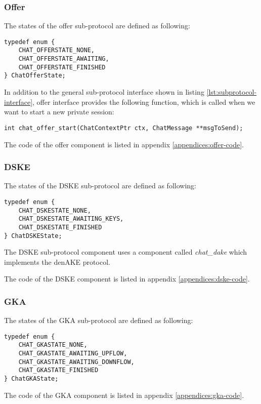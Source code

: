 \subsubsection{Offer}
The states of the offer sub-protocol are defined as following:
\begin{lstlisting}[caption={Offer states}]
typedef enum {
	CHAT_OFFERSTATE_NONE,
	CHAT_OFFERSTATE_AWAITING,
	CHAT_OFFERSTATE_FINISHED
} ChatOfferState;
\end{lstlisting}

In addition to the general sub-protocol interface shown in listing \ref{lst:subprotocol-interface}, offer interface provides the following function, which is called when we want to start a new private session:
\begin{lstlisting}[caption={Offer specific interface}]
int chat_offer_start(ChatContextPtr ctx, ChatMessage **msgToSend);
\end{lstlisting}

The code of the offer component is listed in appendix \ref{appendices:offer-code}.

\subsubsection{DSKE}
The states of the DSKE sub-protocol are defined as following:
\begin{lstlisting}[caption={DSKE states}]
typedef enum {
	CHAT_DSKESTATE_NONE,
	CHAT_DSKESTATE_AWAITING_KEYS,
	CHAT_DSKESTATE_FINISHED
} ChatDSKEState;
\end{lstlisting}

The DSKE sub-protocol component uses a component called \emph{chat\_dake} which implements the denAKE protocol.

The code of the DSKE component is listed in appendix \ref{appendices:dske-code}.

\subsubsection{GKA}
The states of the GKA sub-protocol are defined as following:
\begin{lstlisting}[caption={GKA states}]
typedef enum {
    CHAT_GKASTATE_NONE,
    CHAT_GKASTATE_AWAITING_UPFLOW,
    CHAT_GKASTATE_AWAITING_DOWNFLOW,
    CHAT_GKASTATE_FINISHED
} ChatGKAState;
\end{lstlisting}

The code of the GKA component is listed in appendix \ref{appendices:gka-code}.

